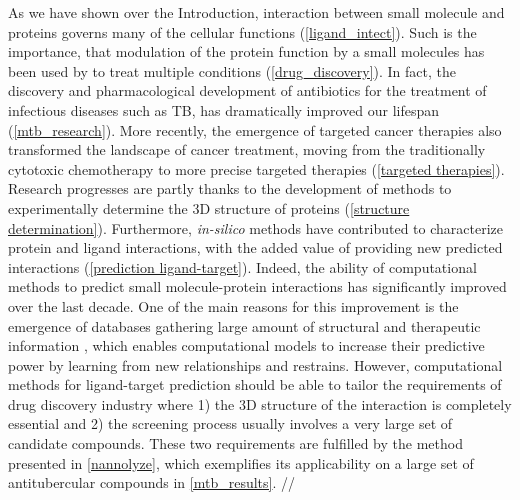 \documentclass[11pt, b5paper,twoside]{tesi_upf}
\begin{document}
\par As we have shown over the Introduction, interaction between small molecule and proteins governs many of the cellular functions (\cref{ligand_intect}). Such is the importance, that modulation of the protein function by a small molecules has been used by to treat multiple conditions (\cref{drug_discovery}). In fact, the discovery and pharmacological development of antibiotics for the treatment of infectious diseases such as TB, has dramatically improved our lifespan (\cref{mtb_research}). More recently, the emergence of targeted cancer therapies also transformed the landscape of cancer treatment, moving from the traditionally cytotoxic chemotherapy to more precise targeted therapies (\cref{targeted therapies}). Research progresses are partly thanks to the development of methods to experimentally determine the 3D structure of proteins (\cref{structure determination}). Furthermore, \textit{in-silico} methods have contributed to characterize protein and ligand interactions, with the added value of providing new predicted interactions (\cref{prediction ligand-target}). Indeed, the ability of computational methods to predict small molecule-protein interactions has significantly improved over the last decade. One of the main reasons for this improvement is the emergence of databases gathering large amount of structural and therapeutic information \cite{Liu2007, Bento2014, Zhu2012}, which enables computational models to increase their predictive power by learning from new relationships and restrains. However, computational methods for ligand-target prediction should be able to tailor the requirements of drug discovery industry where 1) the 3D structure of the interaction is completely essential and 2) the screening process usually involves a very large set of candidate compounds. These two requirements are fulfilled by the method presented in \cref{nannolyze}, which exemplifies its applicability on a large set of antitubercular compounds in \cref{mtb_results}. //
\end{document}
